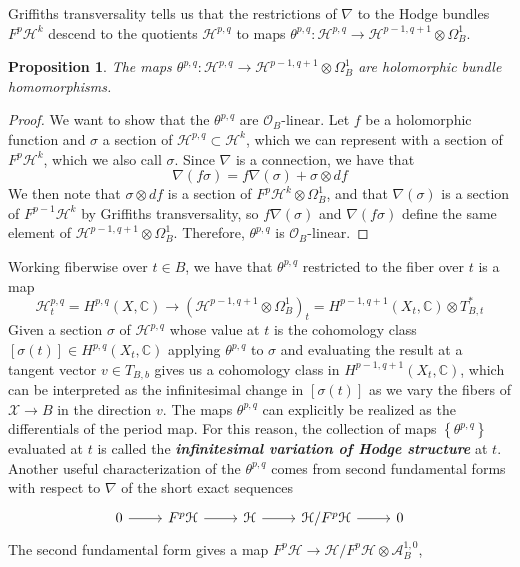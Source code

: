 \documentclass[psamsfonts, 12pt]{amsart}
\newtheorem{prop}[thm]{Proposition}
\theoremstyle{definition}
\theoremstyle{remark}
\renewcommand{\O}{\mathcal{O}}
\newcommand{\ib}[1]{\textbf{\textit{#1}}}
\newcommand{\C}{\mathbb{C}}
\newcommand{\set}[1]{\left\lbrace #1 \right\rbrace}
\begin{document}
%
Griffiths transversality tells us that the restrictions of $\nabla$
to the Hodge bundles $F^p\mathcal{H}^k$ descend to the quotients
$\mathcal{H}^{p,q}$ to maps
$\theta^{p,q} : \mathcal{H}^{p,q} \to \mathcal{H}^{p-1,q+1} \otimes \Omega^1_B$.
%
\begin{prop}
The maps $\theta^{p,q} : \mathcal{H}^{p,q} \to \mathcal{H}^{p-1,q+1} \otimes \Omega^1_B$
are holomorphic bundle homomorphisms.
\end{prop}
%
\begin{proof}
We want to show that the $\theta^{p,q}$ are $\O_B$-linear. Let
$f$ be a holomorphic function and $\sigma$ a section of
$\mathcal{H}^{p,q} \subset \mathcal{H}^k$, which we can represent with
a section of $F^p\mathcal{H}^k$, which we also call $\sigma$.
Since $\nabla$ is a connection, we have that
\[
\nabla(f\sigma) = f\nabla(\sigma) + \sigma \otimes df
\]
We then note that $\sigma \otimes df$ is a section of
$F^p\mathcal{H}^k\otimes \Omega^1_B$, and that
$\nabla(\sigma)$ is a section of $F^{p-1}\mathcal{H}^k$ by Griffiths transversality,
so $f\nabla(\sigma)$ and $\nabla(f\sigma)$ define the same element of
$\mathcal{H}^{p-1,q+1} \otimes \Omega^1_B$. Therefore, $\theta^{p,q}$ is
$\O_B$-linear.
\end{proof}
%
Working fiberwise over $t \in B$, we have that $\theta^{p,q}$ restricted
to the fiber over $t$ is a map
\[
\mathcal{H}^{p,q}_t = H^{p,q}(X,\C) \to
(\mathcal{H}^{p-1,q+1} \otimes \Omega^1_B)_t = H^{p-1,q+1}(X_t,\C) \otimes T^*_{B,t}
\]
Given a section $\sigma$ of $\mathcal{H}^{p,q}$ whose value at
$t$ is the cohomology class $[\sigma(t)] \in H^{p,q}(X_t,\C)$ applying
$\theta^{p,q}$ to $\sigma$ and evaluating the result at a tangent vector
$v \in T_{B,b}$ gives us a cohomology class in $H^{p-1,q+1}(X_t,\C)$, which
can be interpreted as the infinitesimal change in $[\sigma(t)]$ as we vary the
fibers of $\mathcal{X} \to B$ in the direction $v$. The maps $\theta^{p,q}$ can
explicitly be realized as the differentials of the period map.
For this reason, the collection of maps $\set{\theta^{p,q}}$  evaluated at $t$ is
called the \ib{infinitesimal variation of Hodge structure} at $t$.
Another useful characterization of the $\theta^{p,q}$ comes from
second fundamental forms with respect to $\nabla$ of the short exact sequences
%
\[\begin{tikzcd}
0\ar[r]& F^p\mathcal{H}\ar[r]& \mathcal{H} \ar[r] & \mathcal{H}/F^p \mathcal{H} \ar[r]&0
\end{tikzcd}\]
The second fundamental form gives a map
$F^p \mathcal{H} \to \mathcal{H}/F^p \mathcal{H} \otimes \mathcal{A}^{1,0}_B$,
\end{document}
